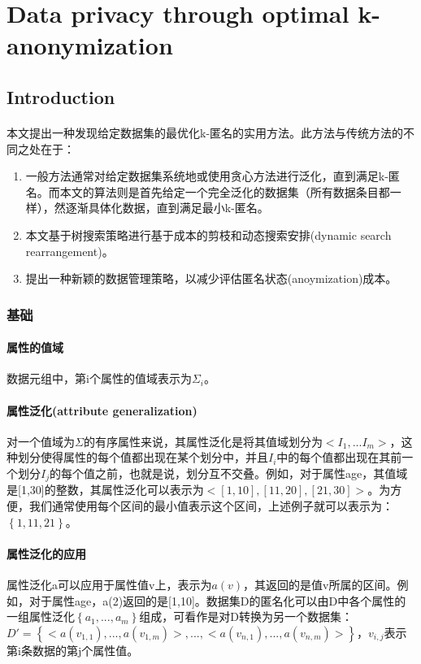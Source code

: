 \documentclass[12pt,a4paper]{article}
\begin{document}
\section{Data privacy through optimal k-anonymization\cite{bayardo2005} }
\subsection{Introduction}
\paragraph{} 本文提出一种发现给定数据集的最优化k-匿名的实用方法。此方法与传统方法的不同之处在于：
\begin{enumerate}
	\item 一般方法通常对给定数据集系统地或使用贪心方法进行泛化，直到满足k-匿名。而本文的算法则是首先给定一个完全泛化的数据集（所有数据条目都一样），然逐渐具体化数据，直到满足最小k-匿名。
	\item 本文基于树搜索策略进行基于成本的剪枝和动态搜索安排(dynamic search rearrangement)。
	\item 提出一种新颖的数据管理策略，以减少评估匿名状态(anoymization)成本。
\end{enumerate}
\subsubsection{基础}
\paragraph{属性的值域} 数据元组中，第i个属性的值域表示为$\Sigma_i$。
\paragraph{属性泛化(attribute generalization)} 对一个值域为$\Sigma$的有序属性来说，其属性泛化是将其值域划分为$<I_1,...I_m>$，这种划分使得属性的每个值都出现在某个划分中，并且$I_i$中的每个值都出现在其前一个划分$I_j$的每个值之前，也就是说，划分互不交叠。例如，对于属性age，其值域是[1,30]的整数，其属性泛化可以表示为$<[1,10],[11,20],[21,30]>$。为方便，我们通常使用每个区间的最小值表示这个区间，上述例子就可以表示为：$ \left \{ 1,11,21 \right \}$。
\paragraph{属性泛化的应用} 属性泛化a可以应用于属性值v上，表示为$a(v)$，其返回的是值v所属的区间。例如，对于属性age，a(2)返回的是[1,10]。数据集D的匿名化可以由D中各个属性的一组属性泛化$\left \{ a_1, ..., a_m \right \}$组成，可看作是对D转换为另一个数据集：$D' = \left \{ <a(v_{1,1}),...,a(v_{1,m})>,...,<a(v_{n,1}),...,a(v_{n,m})> \right \}$，$v_{i,j}$表示第i条数据的第j个属性值。
\end{document}
